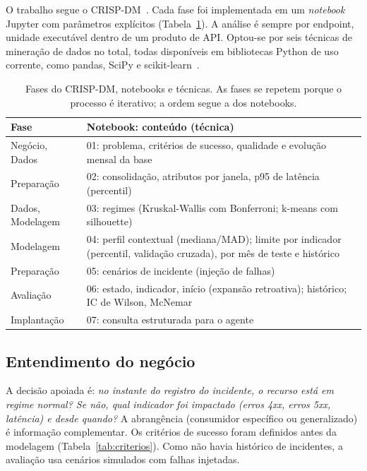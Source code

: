 \documentclass[sigconf,nonacm]{acmart}
\begin{document}
O trabalho segue o CRISP-DM~\citep{wirth2000crispdm,chapman2000crispdm}. Cada fase foi implementada em um \emph{notebook} Jupyter com parâmetros explícitos (Tabela~\ref{tab:fases}). A análise é sempre por endpoint, unidade executável dentro de um produto de API. Optou-se por seis técnicas de mineração de dados no total, todas disponíveis em bibliotecas Python de uso corrente, como pandas, SciPy e scikit-learn~\citep{pedregosa2011sklearn}.


\begin{table}[t]
  \caption{Fases do CRISP-DM, notebooks e técnicas. As fases se repetem porque
  o processo é iterativo; a ordem segue a dos notebooks.}
  \label{tab:fases}
  \small
  \begin{tabular}{p{}p{}}
    \toprule
    Fase & Notebook: conteúdo (técnica) \\
    \midrule
    Negócio, Dados & 01: problema, critérios de sucesso, qualidade e evolução mensal da base \\
    Preparação & 02: consolidação, atributos por janela, p95 de latência (percentil) \\
    Dados, Modelagem & 03: regimes (Kruskal-Wallis com Bonferroni; k-means com silhouette) \\
    Modelagem & 04: perfil contextual (mediana/MAD); limite por indicador (percentil, validação cruzada), por mês de teste e histórico \\
    Preparação & 05: cenários de incidente (injeção de falhas) \\
    Avaliação & 06: estado, indicador, início (expansão retroativa); histórico; IC de Wilson, McNemar \\
    Implantação & 07: consulta estruturada para o agente \\
    \bottomrule
  \end{tabular}
\end{table}

\subsection{Entendimento do negócio}
A decisão apoiada é: \emph{no instante do registro do incidente, o recurso está em regime normal? Se não, qual indicador foi impactado (erros 4xx, erros 5xx, latência) e desde quando?} A abrangência (consumidor específico ou generalizado) é informação complementar. Os critérios de sucesso foram definidos antes da modelagem (Tabela~\ref{tab:criterios}). Como não havia histórico de incidentes, a avaliação usa cenários simulados com falhas injetadas.
\end{document}
